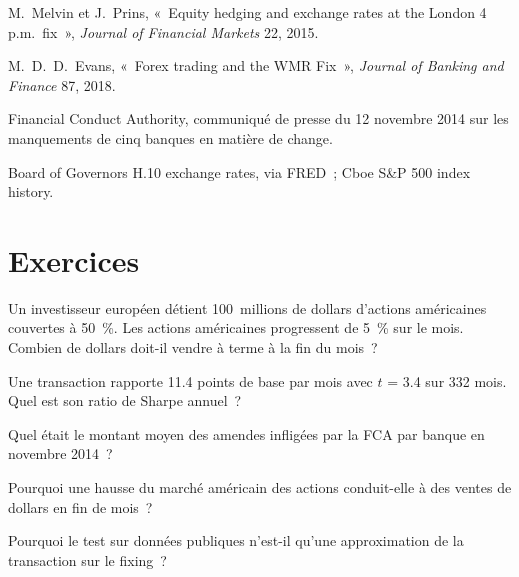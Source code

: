 \begin{omsources}
\item M.~Melvin et J.~Prins, «~Equity hedging and exchange rates at the London 4 p.m.\ fix~», \emph{Journal of Financial Markets} 22, 2015.
\item M.~D.~D.~Evans, «~Forex trading and the WMR Fix~», \emph{Journal of Banking and Finance} 87, 2018.
\item Financial Conduct Authority, communiqué de presse du 12 novembre 2014 sur les manquements de cinq banques en matière de change.
\item Board of Governors H.10 exchange rates, via FRED~; Cboe S\&P 500 index history.
\end{omsources}

\section{Exercices}

\begin{exercise}[$\star$]\label{exo:s2:fx-flow-strategies:1}
Un investisseur européen détient 100~millions de dollars d'actions américaines couvertes à 50~\%. Les actions américaines progressent de 5~\% sur le mois. Combien de dollars doit-il vendre à terme
à la fin du mois~?
\end{exercise}

\begin{exercise}[$\star$]\label{exo:s2:fx-flow-strategies:2}
Une transaction rapporte 11.4 points de base par mois avec $t$ = 3.4 sur 332 mois. Quel est son ratio de Sharpe annuel~?
\end{exercise}

\begin{exercise}[$\star$]\label{exo:s2:fx-flow-strategies:3}
Quel était le montant moyen des amendes infligées par la FCA par banque en novembre 2014~?
\end{exercise}

\begin{exercise}[$\star\star$]\label{exo:s2:fx-flow-strategies:4}
Pourquoi une hausse du marché américain des actions conduit-elle à des ventes de dollars en fin de mois~?
\end{exercise}

\begin{exercise}[$\star\star$]\label{exo:s2:fx-flow-strategies:5}
Pourquoi le test sur données publiques n'est-il qu'une approximation de la transaction sur le fixing~?
\end{exercise}

